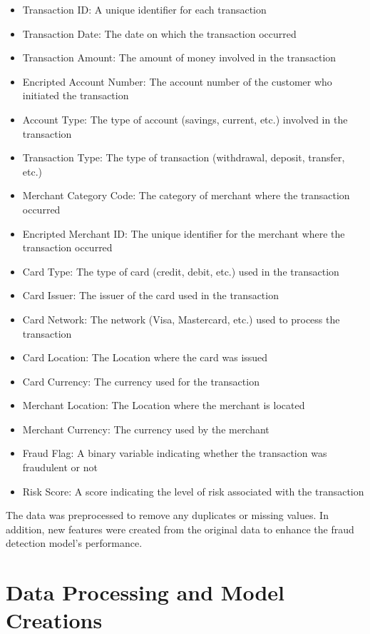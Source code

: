 \begin{itemize}
    \item Transaction ID: A unique identifier for each transaction
    \item Transaction Date: The date on which the transaction occurred
    \item Transaction Amount: The amount of money involved in the transaction
    \item Encripted Account Number: The account number of the customer who initiated the transaction
    \item Account Type: The type of account (savings, current, etc.) involved in the transaction
    \item Transaction Type: The type of transaction (withdrawal, deposit, transfer, etc.)
    \item Merchant Category Code: The category of merchant where the transaction occurred
    \item Encripted Merchant ID: The unique identifier for the merchant where the transaction occurred
    \item Card Type: The type of card (credit, debit, etc.) used in the transaction
    \item Card Issuer: The issuer of the card used in the transaction
    \item Card Network: The network (Visa, Mastercard, etc.) used to process the transaction
    \item Card Location: The Location where the card was issued
    \item Card Currency: The currency used for the transaction
    \item Merchant Location: The Location where the merchant is located
    \item Merchant Currency: The currency used by the merchant
    \item Fraud Flag: A binary variable indicating whether the transaction was fraudulent or not
    \item Risk Score: A score indicating the level of risk associated with the transaction
\end{itemize}
The data was preprocessed to remove any duplicates or missing values. In addition, new features were 
created from the original data to enhance the fraud detection model's performance.


\section{Data Processing and Model Creations}
